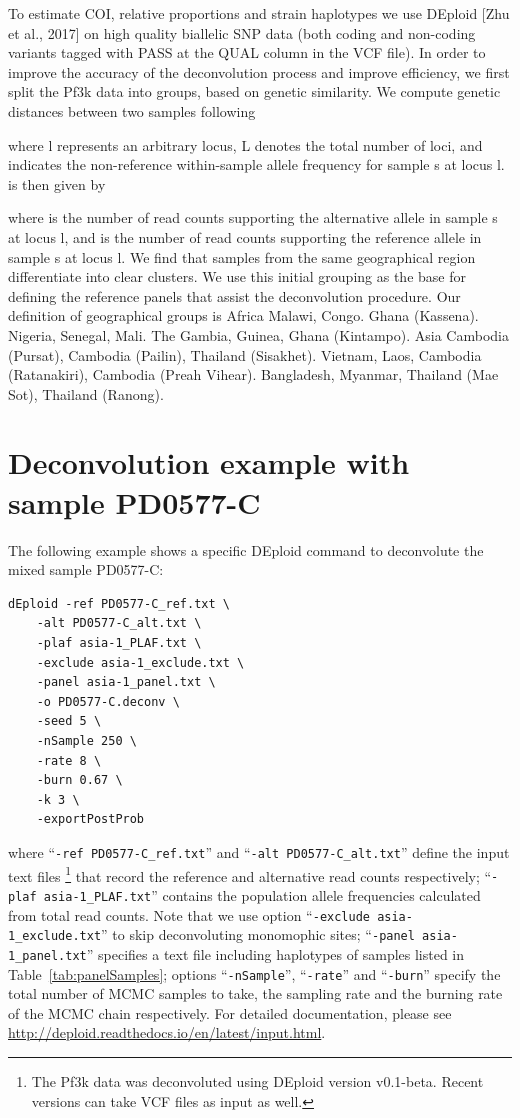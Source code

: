 \documentclass{article}
\begin{document}
To estimate COI, relative proportions and strain haplotypes we use DEploid [Zhu et al., 2017] on high quality biallelic SNP data (both coding and non-coding variants tagged with PASS at the QUAL column in the VCF file). In order to improve the accuracy of the deconvolution process and improve efficiency, we first split the Pf3k data into groups, based on genetic similarity. We compute genetic distances between two samples following

where l represents an arbitrary locus, L denotes the total number of loci, and  indicates the non-reference within-sample allele frequency for sample s at locus l.  is then given by

where  is the number of read counts supporting the alternative allele in sample s at locus l, and  is the number of read counts supporting the reference allele in sample s at locus l.
We find that samples from the same geographical region differentiate into clear clusters. We use this initial grouping as the base for defining the reference panels that assist the deconvolution procedure. Our definition of geographical groups is
Africa
Malawi, Congo.
Ghana (Kassena).
Nigeria, Senegal, Mali.
The Gambia, Guinea, Ghana (Kintampo).
Asia
Cambodia (Pursat), Cambodia (Pailin), Thailand (Sisakhet).
Vietnam, Laos, Cambodia (Ratanakiri), Cambodia (Preah Vihear).
Bangladesh, Myanmar, Thailand (Mae Sot), Thailand (Ranong).

\newpage


\section{Deconvolution example with sample PD0577-C}

The following example shows a specific {\textmd DEploid} command to deconvolute the mixed sample {\textmd PD0577-C}:
\linespread{1}
\begin{lstlisting}
dEploid -ref PD0577-C_ref.txt \
    -alt PD0577-C_alt.txt \
    -plaf asia-1_PLAF.txt \
    -exclude asia-1_exclude.txt \
    -panel asia-1_panel.txt \
    -o PD0577-C.deconv \
    -seed 5 \
    -nSample 250 \
    -rate 8 \
    -burn 0.67 \
    -k 3 \
    -exportPostProb
\end{lstlisting}
\linespread{1.5}
where ``{\tt -ref PD0577-C\_ref.txt}'' and ``{\tt -alt PD0577-C\_alt.txt}'' define the input text files \footnote{The Pf3k data was deconvoluted using DEploid version v0.1-beta. Recent versions can take VCF files as input as well.} that record the reference and alternative read counts respectively; ``{\tt -plaf asia-1\_PLAF.txt}'' contains the population allele frequencies calculated from total read counts. Note that we use option ``{\tt -exclude asia-1\_exclude.txt}'' to skip deconvoluting monomophic sites; ``{\tt -panel asia-1\_panel.txt}'' specifies a text file including haplotypes of samples listed in Table~\ref{tab:panelSamples}; options ``{\tt -nSample}'', ``{\tt -rate}'' and ``{\tt -burn}'' specify the total number of MCMC samples to take, the sampling rate and the burning rate of the MCMC chain respectively. For detailed documentation, please see \url{http://deploid.readthedocs.io/en/latest/input.html}.
\end{document}
